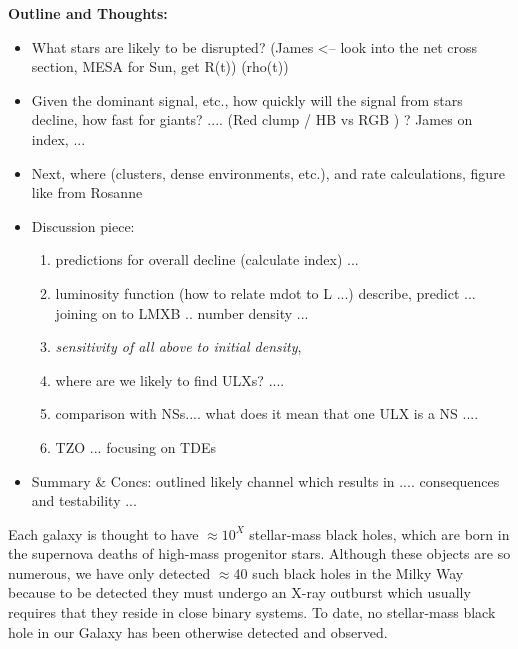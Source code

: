 \bf{Outline and Thoughts:}\\
\begin{itemize}
\item What stars are likely to be disrupted?  (James <-- look into the net cross section, MESA for Sun, get R(t)) (rho(t)) \\
\item Given the dominant signal, etc., how quickly will the signal from stars decline, how fast for giants? .... (Red clump / HB vs RGB ) ?  James on index, ... \\ 
\item Next, where (clusters, dense environments, etc.), and rate calculations, figure like from Rosanne \\
\item Discussion piece: 
\begin{enumerate}
    \item predictions for overall decline (calculate index) ... 
    \item luminosity function (how to relate mdot to L ...) describe, predict  ... joining on to LMXB .. number density ... 
    \item {\it sensitivity of all above to initial density},  
    \item where are we likely to find ULXs? .... 
    \item comparison with NSs.... what does it mean that one ULX is a NS .... 
    \item TZO ... focusing on TDEs 
    \end{enumerate}
    
\item Summary & Concs: outlined likely channel which results in .... consequences and testability ... 
\end{itemize}






Each galaxy is thought to have $\approx 10^X$ stellar-mass black
holes, which are born in the supernova deaths of high-mass progenitor
stars.  Although these objects are so numerous, we have only detected
$\approx$40 such black holes in the Milky Way because to be detected
they must undergo an X-ray outburst which usually requires that they
reside in close binary systems.  To date, no stellar-mass black hole
in our Galaxy has been otherwise detected and observed.


